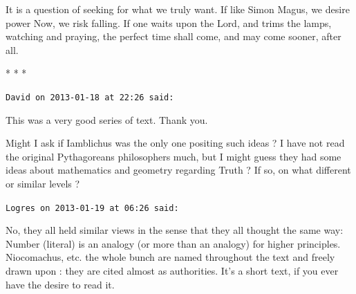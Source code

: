 It is a question of seeking for what we truly want. If like Simon Magus, we desire power Now, we risk falling. If one waits upon the Lord, and trims the lamps, watching and praying, the perfect time shall come, and may come sooner, after all.



\begin{center}* * *\end{center}

\begin{footnotesize}
\begin{sffamily}
\texttt{David on 2013-01-18 at 22:26 said:}

This was a very good series of text. Thank you.

Might I ask if Iamblichus was the only one positing such ideas ? I have not read the original Pythagoreans philosophers much, but I might guess they had some ideas about mathematics and geometry regarding Truth ? If so, on what different or similar levels ?

\hfill

\texttt{Logres on 2013-01-19 at 06:26 said:}

No, they all held similar views in the sense that they all thought the same way: Number (literal) is an analogy (or more than an analogy) for higher principles. Niocomachus, etc. the whole bunch are named throughout the text and freely drawn upon : they are cited almost as authorities. It's a short text, if you ever have the desire to read it.


\hfill

\end{sffamily}
\end{footnotesize}

